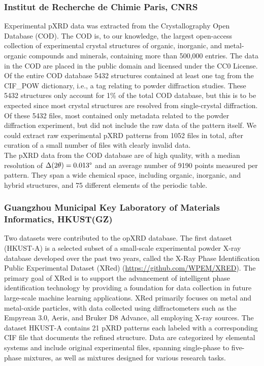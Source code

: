 \subsubsection*{Institut de Recherche de Chimie Paris, CNRS}

Experimental pXRD data was extracted from the Crystallography Open Database (COD)\cite{Grazulis2009, Vaitkus2023}. The COD is, to our knowledge, the largest open-access collection of experimental crystal structures of organic, inorganic, and metal-organic compounds and minerals, containing more than 500,000 entries. The data in the COD are placed in the public domain and licensed under the CC0 License. Of the entire COD database 5432 structures contained at least one tag from the {CIF\_POW} dictionary, i.e., a tag relating to powder diffraction studies. These 5432 structures only account for 1\% of the total COD database, but this is to be expected since most crystal structures are resolved from single-crystal diffraction. Of these 5432 files, most contained only metadata related to the powder diffraction experiment, but did not include the raw data of the pattern itself. We could extract raw experimental pXRD patterns from 1052 files in total, after curation of a small number of files with clearly invalid data. \\

The pXRD data from the COD database are of high quality, with a median resolution of $\Delta(2\theta) = 0.013\degree$ and an average number of 9190 points measured per pattern. They span a wide chemical space, including organic, inorganic, and hybrid structures, and 75 different elements of the periodic table.



\subsubsection*{Guangzhou Municipal Key Laboratory of Materials Informatics, HKUST(GZ)}

Two datasets were contributed to the opXRD database. The first dataset (HKUST-A) is a selected subset of a small-scale experimental powder X-ray database developed over the past two years, called the X-Ray Phase Identification Public Experimental Dataset (XRed) (\url{https://github.com/WPEM/XRED}). The primary goal of XRed is to support the advancement of intelligent phase identification technology by providing a foundation for data collection in future large-scale machine learning applications. XRed primarily focuses on metal and metal-oxide particles, with data collected using diffractometers such as the Empyrean 3.0, Aeris, and Bruker D8 Advance, all employing  X-ray sources. The dataset HKUST-A contains 21 pXRD patterns each labeled with a corresponding CIF file that documents the refined structure. Data are categorized by elemental systems and include original experimental files, spanning single-phase to five-phase mixtures, as well as mixtures designed for various research tasks. \\

